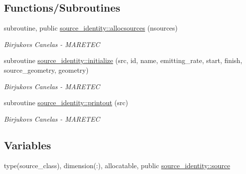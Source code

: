 \subsection*{Functions/\+Subroutines}
\begin{DoxyCompactItemize}
\item 
subroutine, public \mbox{\hyperlink{namespacesource__identity_a716b4cb4acec5756a6d4dcf20eee588e}{source\+\_\+identity\+::allocsources}} (nsources)
\begin{DoxyCompactList}\small\item\em Birjukovs Canelas -\/ M\+A\+R\+E\+T\+EC \end{DoxyCompactList}\item 
subroutine \mbox{\hyperlink{namespacesource__identity_a8d7aaa58c575f6ed78f5ca29d64615d7}{source\+\_\+identity\+::initialize}} (src, id, name, emitting\+\_\+rate, start, finish, source\+\_\+geometry, geometry)
\begin{DoxyCompactList}\small\item\em Birjukovs Canelas -\/ M\+A\+R\+E\+T\+EC \end{DoxyCompactList}\item 
subroutine \mbox{\hyperlink{namespacesource__identity_a9715a7d707b4c80aa2d2ebd08712f6a9}{source\+\_\+identity\+::printout}} (src)
\begin{DoxyCompactList}\small\item\em Birjukovs Canelas -\/ M\+A\+R\+E\+T\+EC \end{DoxyCompactList}\end{DoxyCompactItemize}
\subsection*{Variables}
\begin{DoxyCompactItemize}
\item 
type(source\+\_\+class), dimension(\+:), allocatable, public \mbox{\hyperlink{namespacesource__identity_a5ed8006613af7461c6a2ff1cdaeb8f0f}{source\+\_\+identity\+::source}}
\end{DoxyCompactItemize}
